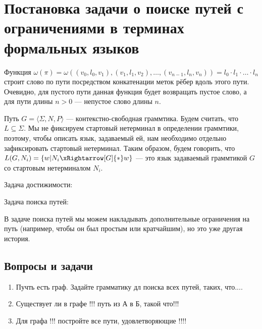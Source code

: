 \section{Постановка задачи о поиске путей с ограничениями в терминах формальных языков}



Функция $\omega(\pi) = \omega((v_0, l_0, v_1),(v_1,l_1,v_2),\dots,(v_{n-1},l_n,v_n)) = l_0 \cdot l_1 \cdot \ldots \cdot l_n $ строит слово по пути посредством конкатенации меток рёбер вдоль этого пути.
Очевидно, для пустого пути данная функция будет возвращать пустое слово, а для пути длины $n  > 0$ --- непустое слово длины $n$.

Путь $G = \langle \Sigma, N, P \rangle$ --- контекстно-свободная граммтика.
Будем считать, что $L \subseteq \Sigma$.
Мы не фиксируем стартовый нетерминал в определении граммтики, поэтому, чтобы описать язык, задаваемый ей, нам необходимо отдельно зафиксировать стартовый нетерминал.
Таким образом, будем говорить, что $L(G,N_i) = \{ w | N_i \xRightarrow[G]{*} w  \}$ --- это язык задаваемый граммтикой $G$ со стартовым нетерминалом $N_i$.

Задача достижимости:

Задача поиска путей:

В задаче поиска путей мы можем накладывать дополнительные ограничения на путь (например, чтобы он был простым или кратчайшим), но это уже другая история.


\subsection{Вопросы и задачи}
\begin{enumerate}
  \item Пучть есть граф. Задайте грамматику дл поиска всех путей, таких, что....
  \item Существует ли в графе !!! путь из А в Б, такой что!!!
  \item Для графа !!! постройте все пути, удовлетворяющие !!!!
\end{enumerate}
